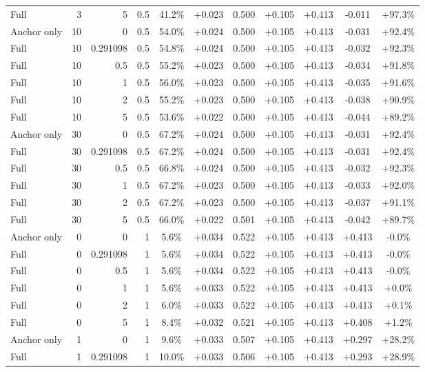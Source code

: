 \begin{table}[htbp]
\begin{tabular}{lrrrccccccc}
Full & 3 & 5 & 0.5 & 41.2\% & +0.023 & 0.500 & +0.105 & +0.413 & -0.011 & +97.3\% \\
Anchor only & 10 & 0 & 0.5 & 54.0\% & +0.024 & 0.500 & +0.105 & +0.413 & -0.031 & +92.4\% \\
Full & 10 & 0.291098 & 0.5 & 54.8\% & +0.024 & 0.500 & +0.105 & +0.413 & -0.032 & +92.3\% \\
Full & 10 & 0.5 & 0.5 & 55.2\% & +0.023 & 0.500 & +0.105 & +0.413 & -0.034 & +91.8\% \\
Full & 10 & 1 & 0.5 & 56.0\% & +0.023 & 0.500 & +0.105 & +0.413 & -0.035 & +91.6\% \\
Full & 10 & 2 & 0.5 & 55.2\% & +0.023 & 0.500 & +0.105 & +0.413 & -0.038 & +90.9\% \\
Full & 10 & 5 & 0.5 & 53.6\% & +0.022 & 0.500 & +0.105 & +0.413 & -0.044 & +89.2\% \\
Anchor only & 30 & 0 & 0.5 & 67.2\% & +0.024 & 0.500 & +0.105 & +0.413 & -0.031 & +92.4\% \\
Full & 30 & 0.291098 & 0.5 & 67.2\% & +0.024 & 0.500 & +0.105 & +0.413 & -0.031 & +92.4\% \\
Full & 30 & 0.5 & 0.5 & 66.8\% & +0.024 & 0.500 & +0.105 & +0.413 & -0.032 & +92.3\% \\
Full & 30 & 1 & 0.5 & 67.2\% & +0.023 & 0.500 & +0.105 & +0.413 & -0.033 & +92.0\% \\
Full & 30 & 2 & 0.5 & 67.2\% & +0.023 & 0.500 & +0.105 & +0.413 & -0.037 & +91.1\% \\
Full & 30 & 5 & 0.5 & 66.0\% & +0.022 & 0.501 & +0.105 & +0.413 & -0.042 & +89.7\% \\
Anchor only & 0 & 0 & 1 & 5.6\% & +0.034 & 0.522 & +0.105 & +0.413 & +0.413 & -0.0\% \\
Full & 0 & 0.291098 & 1 & 5.6\% & +0.034 & 0.522 & +0.105 & +0.413 & +0.413 & -0.0\% \\
Full & 0 & 0.5 & 1 & 5.6\% & +0.034 & 0.522 & +0.105 & +0.413 & +0.413 & -0.0\% \\
Full & 0 & 1 & 1 & 5.6\% & +0.033 & 0.522 & +0.105 & +0.413 & +0.413 & +0.0\% \\
Full & 0 & 2 & 1 & 6.0\% & +0.033 & 0.522 & +0.105 & +0.413 & +0.413 & +0.1\% \\
Full & 0 & 5 & 1 & 8.4\% & +0.032 & 0.521 & +0.105 & +0.413 & +0.408 & +1.2\% \\
Anchor only & 1 & 0 & 1 & 9.6\% & +0.033 & 0.507 & +0.105 & +0.413 & +0.297 & +28.2\% \\
Full & 1 & 0.291098 & 1 & 10.0\% & +0.033 & 0.506 & +0.105 & +0.413 & +0.293 & +28.9\% \\

\end{tabular}
\end{table}

